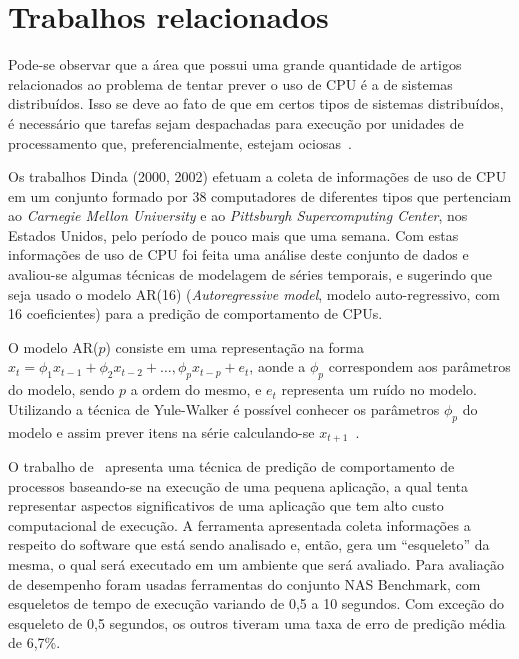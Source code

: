 %
%
\chapter{Trabalhos relacionados}\label{sec:relacionados}

Pode-se observar que a área que possui uma grande quantidade de artigos
relacionados ao problema de tentar prever o uso de CPU é a de sistemas
distribuídos. Isso se deve ao fato de que em certos tipos de sistemas
distribuídos, é necessário que tarefas sejam despachadas para execução por
unidades de processamento que, preferencialmente, estejam ociosas~\cite{zhang2007cpu}.

Os trabalhos Dinda (2000, 2002)\nocite{dinda2000host}
\nocite{dinda2002evaluation} efetuam a coleta de informações de uso de
CPU em um conjunto formado por 38 computadores de diferentes tipos que
pertenciam ao \emph{Carnegie Mellon University} e ao \emph{Pittsburgh
Supercomputing Center}, nos Estados Unidos, pelo período de pouco mais que uma
semana. Com estas informações de uso de CPU foi feita uma análise deste conjunto
de dados e avaliou-se algumas técnicas de modelagem de séries temporais, e
sugerindo que seja usado o modelo AR(16) (\emph{Autoregressive model},
modelo auto-regressivo, com 16 coeficientes) para a predição de comportamento
de CPUs.

O modelo AR($p$) consiste em uma representação na forma
$x_t = \phi_{1}x_{t-1} + \phi_{2}x_{t-2}+\dotsc,\phi_{p}x_{t-p}+e_t$, aonde a
$\phi_p$ correspondem aos parâmetros do modelo, sendo $p$ a ordem do mesmo, e
$e_t$ representa um ruído no modelo. Utilizando a técnica de Yule-Walker é
possível conhecer os parâmetros $\phi_p$ do modelo e assim prever itens na
série calculando-se $x_{t+1}$~\cite{baddour2005autoregressive}.

O trabalho de~ apresenta uma técnica de
predição de comportamento de processos baseando-se na execução de uma pequena
aplicação, a qual tenta representar aspectos significativos de uma aplicação que
tem alto custo computacional de execução. A ferramenta apresentada coleta
informações a respeito do software que está sendo analisado e, então, gera um
“esqueleto” da mesma, o qual será executado em um ambiente que será
avaliado. Para avaliação de desempenho foram usadas ferramentas do conjunto NAS
Benchmark, com esqueletos de tempo de execução variando de 0,5 a 10 segundos.
Com exceção do esqueleto de 0,5 segundos, os outros tiveram uma taxa de erro de
predição média de 6,7\%. 

